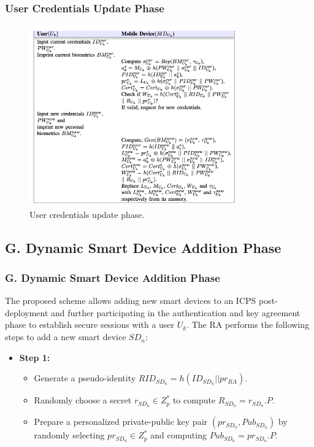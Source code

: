 \documentclass[9pt,handout]{beamer}
\begin{document}
\begin{frame}
    \frametitle{User Credentials Update Phase}

    \begin{figure}
        \centering
        
        \includegraphics[width=0.8\textwidth]{fig4.png}
        \caption{User credentials update phase.}
        \label{fig:user_credentials_update}
    \end{figure}

\end{frame}

\subsection{G. Dynamic Smart Device Addition Phase}
\begin{frame}
    \frametitle{G. Dynamic Smart Device Addition Phase}

    The proposed scheme allows adding new smart devices to an ICPS post-deployment and further participating in the authentication and key agreement phase to establish secure sessions with a user \( U_k \). The RA performs the following steps to add a new smart device \( SD_n \):

    \begin{itemize}
        \item \textbf{Step 1:} 
        \begin{itemize}
            \item Generate a pseudo-identity \( RID_{SD_n} = h(ID_{SD_n} || pr_{RA}) \).
            \item Randomly choose a secret \( r_{SD_n} \in Z^*_p \) to compute \( R_{SD_n} = r_{SD_n}.P \).
            \item Prepare a personalized private-public key pair \( (pr_{SD_n}, Pub_{SD_n}) \) by randomly selecting \( pr_{SD_n} \in Z^*_p \) and computing \( Pub_{SD_n} = pr_{SD_n}.P \).
        \end{itemize}
        
       
    \end{itemize}


\end{frame}
\end{document}
